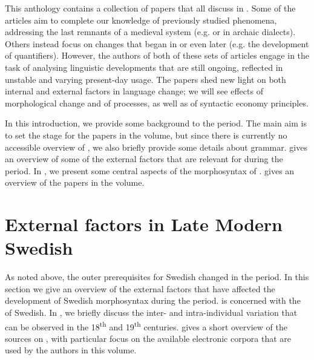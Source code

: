 \documentclass[output=paper]{langscibook}
\begin{document}
This anthology contains a collection of papers that all discuss  in . Some of the articles aim to complete our knowledge of previously studied phenomena, addressing the last remnants of a medieval system (e.g.  or  in archaic dialects). Others instead focus on changes that began in  or even later (e.g. the development of quantifiers). However, the authors of both of these sets of articles engage in the task of analysing linguistic developments that are still ongoing, reflected in unstable and varying present-day usage. The papers shed new light on both internal and external factors in language change; we will see effects of morphological change and of  processes, as well as of syntactic economy principles.



In this introduction, we provide some background to the  period. The main aim is to set the stage for the papers in the volume, but since there is currently no accessible overview of , we also briefly provide some details about  grammar.  gives an overview of some of the external factors that are relevant for  during the period. In , we present some central aspects of the morphosyntax of .  gives an overview of the papers in the volume.


\section{External factors in Late Modern Swedish }\label{sec:intro:2}


As noted above, the outer prerequisites for Swedish changed in the  period. In this section we give an overview of the external factors that have affected the development of Swedish morphosyntax during the period.  is concerned with the  of Swedish. In , we briefly discuss the inter- and intra-individual variation that can be observed in the 18\textsuperscript{th} and 19\textsuperscript{th} centuries.  gives a short overview of the sources on , with particular focus on the available electronic corpora that are used by the authors in this volume.
\end{document}
